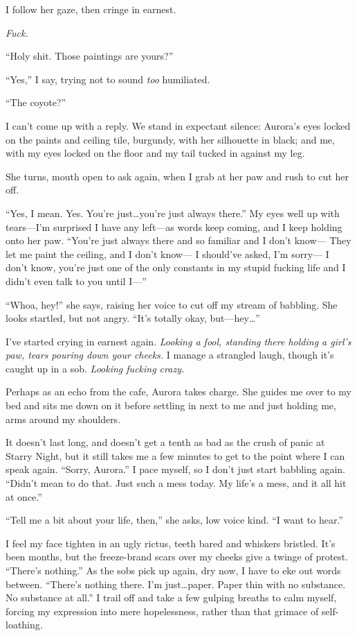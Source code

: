 I follow her gaze, then cringe in earnest.

\emph{Fuck.}

``Holy shit. Those paintings are yours?''

``Yes,'' I say, trying not to sound \emph{too} humiliated.

``The coyote?''

I can't come up with a reply. We stand in expectant silence: Aurora's eyes locked on the paints and ceiling tile, burgundy, with her silhouette in black; and me, with my eyes locked on the floor and my tail tucked in against my leg.

She turns, mouth open to ask again, when I grab at her paw and rush to cut her off.

``Yes, I mean. Yes. You're just\ldots{}you're just always there.'' My eyes well up with tears---I'm surprised I have any left---as words keep coming, and I keep holding onto her paw. ``You're just always there and so familiar and I don't know--- They let me paint the ceiling, and I don't know--- I should've asked, I'm sorry--- I don't know, you're just one of the only constants in my stupid fucking life and I didn't even talk to you until I---''

``Whoa, hey!'' she says, raising her voice to cut off my stream of babbling. She looks startled, but not angry. ``It's totally okay, but---hey\ldots{}''

I've started crying in earnest again. \emph{Looking a fool, standing there holding a girl's paw, tears pouring down your cheeks.} I manage a strangled laugh, though it's caught up in a sob. \emph{Looking fucking crazy.}

Perhaps as an echo from the cafe, Aurora takes charge. She guides me over to my bed and sits me down on it before settling in next to me and just holding me, arms around my shoulders.

It doesn't last long, and doesn't get a tenth as bad as the crush of panic at Starry Night, but it still takes me a few minutes to get to the point where I can speak again. ``Sorry, Aurora.'' I pace myself, so I don't just start babbling again. ``Didn't mean to do that. Just such a mess today. My life's a mess, and it all hit at once.''

``Tell me a bit about your life, then,'' she asks, low voice kind. ``I want to hear.''

I feel my face tighten in an ugly rictus, teeth bared and whiskers bristled. It's been months, but the freeze-brand scars over my cheeks give a twinge of protest. ``There's nothing.'' As the sobs pick up again, dry now, I have to eke out words between. ``There's nothing there. I'm just\ldots{}paper. Paper thin with no substance. No substance at all.'' I trail off and take a few gulping breaths to calm myself, forcing my expression into mere hopelessness, rather than that grimace of self-loathing.

